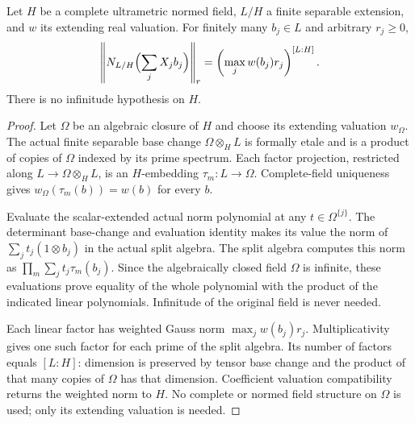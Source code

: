 \begin{theorem}
\label{spectrum:weighted-field-norm-without-infinitude}
\leanok
{}
Let $H$ be a complete ultrametric normed field, $L/H$ a finite separable
extension, and $w$ its extending real valuation. For finitely many $b_j\in L$
and arbitrary $r_j\ge0$,
\[
 \left\|N_{L/H}\Bigl(\sum_j X_jb_j\Bigr)\right\|_r
 =\left(\max_j w(b_j)r_j\right)^{[L:H]}.
\]
There is no infinitude hypothesis on $H$.
\end{theorem}
\begin{proof}
Let $\Omega$ be an algebraic closure of $H$ and choose its extending
valuation $w_\Omega$. The actual finite separable base change
$\Omega\otimes_H L$ is formally etale and is a product of copies of
$\Omega$ indexed by its prime spectrum. Each factor projection, restricted
along $L\to\Omega\otimes_H L$, is an $H$-embedding $\tau_m:L\to\Omega$.
Complete-field uniqueness gives $w_\Omega(\tau_m(b))=w(b)$ for every $b$.

Evaluate the scalar-extended actual norm polynomial at any
$t\in\Omega^{\{j\}}$. The determinant base-change and evaluation identity
makes its value the norm of $\sum_j t_j(1\otimes b_j)$ in the actual split
algebra. The split algebra computes this norm as
$\prod_m\sum_j t_j\tau_m(b_j)$. Since the algebraically closed field
$\Omega$ is infinite, these evaluations prove equality of the whole
polynomial with the product of the indicated linear polynomials.
Infinitude of the original field is never needed.

Each linear factor has weighted Gauss norm $\max_j w(b_j)r_j$.
Multiplicativity gives one such factor for each prime of the split algebra. Its
number of factors equals $[L:H]$: dimension is preserved by tensor base
change and the product of that many copies of $\Omega$ has that dimension.
Coefficient valuation compatibility returns the weighted norm to $H$.
No complete or normed field structure on $\Omega$ is used; only its
extending valuation is needed.
\end{proof}

